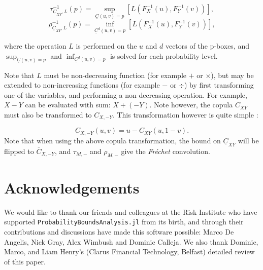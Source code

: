 \documentclass{juliacon}
\begin{document}
\begin{equation*}\label{taupbox2}
  \tau^{-1}_{\underline{C}_{XY},L}(p) = \sup_{\underline{C}(u,v) = p} [L(F^{-1}_{X}(u), F^{-1}_Y(v))],
\end{equation*}
\begin{equation*}\label{rhopbox2}
  \rho^{-1}_{\underline{C}_{XY},L}(p) = \inf_{\underline{C}^{d}(u,v) = p} [L(F^{-1}_{X}(u), F^{-1}_Y(v))],
\end{equation*}

where the operation $L$ is performed on the $u$ and $d$ vectors of the p-boxes, and $\sup_{\underline{C}(u,v) = p}$ and $\inf_{\underline{C}^{d}(u,v) = p}$ is solved for each probability level.

Note that $L$ must be non-decreasing function (for example $+$ or $\times$), but may be extended to non-increasing functions (for example $-$ or $\div$) by first transforming one of the variables, and performing a non-decreasing operation. For example, $X - Y$ can be evaluated with sum: $X + (-Y)$. Note however, the copula $C_{XY}$ must also be transformed to $C_{X,-Y}$. This transformation however is quite simple \cite{nelsen2007introduction}: 

\begin{equation*}\label{rotation}
  C_{X, -Y}(u,v) = u - C_{XY}(u, 1 - v).
\end{equation*}
Note that when using the above copula transformation, the bound on $\underline{C}_{XY}$ will be flipped to $\overline{C}_{X, -Y}$, and $\tau_{M, -}$ and $\rho_{M,-}$ give the \textit{Fréchet} convolution.
\fi

\section*{Acknowledgements}
We would like to thank our friends and colleagues at the Risk Institute who have supported \texttt{ProbabilityBoundsAnalysis.jl} from its birth, and through their contributions and discussions have made this software possible: Marco De Angelis, Nick Gray, Alex Wimbush and Dominic Calleja. We also thank Dominic, Marco, and Liam Henry's (Clarus Financial Technology, Belfast) detailed review of this paper.
\end{document}
